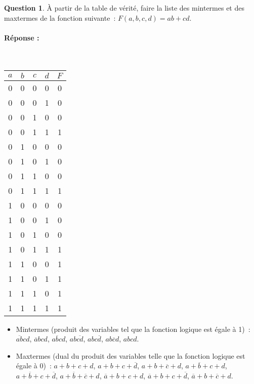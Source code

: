 \documentclass[11pt,a4paper]{article}
\theoremstyle{definition}%
\newtheorem{Q}{Question}[] %
\newcommand{\reponse}[1]{%
	\ifthenelse {\boolean{corrige}} {\paragraph{Réponse :} \color{darkblue}   #1\color{black}} {}
 }
\begin{document}
\begin{Q}
À partir de la table de vérité, faire la liste des mintermes et des maxtermes de la fonction suivante~: $F(a,b,c,d) = ab + cd$.
\reponse{~\\
	\begin{tabular}{|c|c|c|c|c|} \hline
	$a$ & $b$ & $c$ & $d$ & $F$ \\ \hline
	0 & 0 & 0 & 0 & 0 \\ \hline
	0 & 0 & 0 & 1 & 0 \\ \hline
	0 & 0 & 1 & 0 & 0 \\ \hline
	0 & 0 & 1 & 1 & 1 \\ \hline
	0 & 1 & 0 & 0 & 0 \\ \hline
	0 & 1 & 0 & 1 & 0 \\ \hline
	0 & 1 & 1 & 0 & 0 \\ \hline
	0 & 1 & 1 & 1 & 1 \\ \hline
	1 & 0 & 0 & 0 & 0 \\ \hline
	1 & 0 & 0 & 1 & 0 \\ \hline
	1 & 0 & 1 & 0 & 0 \\ \hline
	1 & 0 & 1 & 1 & 1 \\ \hline
	1 & 1 & 0 & 0 & 1 \\ \hline
	1 & 1 & 0 & 1 & 1 \\ \hline
	1 & 1 & 1 & 0 & 1 \\ \hline
	1 & 1 & 1 & 1 & 1 \\ \hline
	\end{tabular}

	\begin{itemize}
		\item Mintermes (produit des variables tel que la fonction logique est égale à 1)~: $\overline{ab}cd$, $\overline{a}bcd$, $a\overline{b}cd$, $ab\overline{cd}$, $abc\overline{d}$, $ab\overline{c}d$, $abcd$.

		\item Maxtermes (dual du produit des variables telle que la fonction logique est égale à 0)~:	$a + b + c + d$, $a + b + c + \overline{d}$, $a + b + \overline{c} + d$, $a + \overline{b} + c + d$, $a + \overline{b} + c + \overline{d}$, $a + \overline{b} + \overline{c} + d$, $\overline{a} + b + c + d$, $\overline{a} + b + c + \overline{d}$, $\overline{a} + b + \overline{c} + d$.
	\end{itemize}

}
\end{Q}
\end{document}
